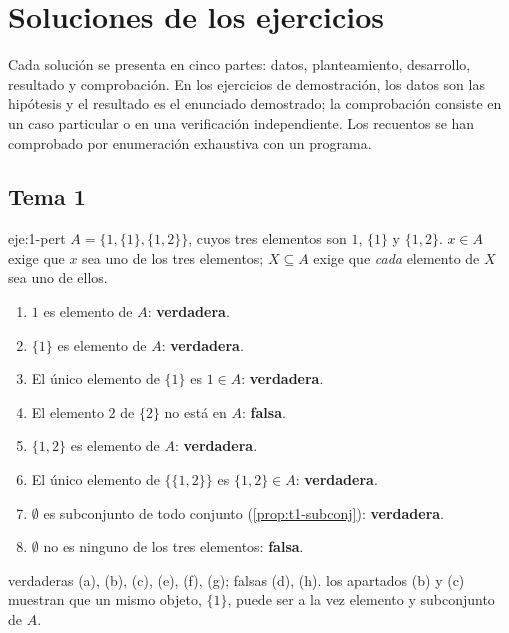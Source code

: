 \chapter{Soluciones de los ejercicios}
\label{ap:soluciones}

Cada solución se presenta en cinco partes: datos, planteamiento, desarrollo, resultado y comprobación. En los ejercicios de demostración, los datos son las hipótesis y el resultado es el enunciado demostrado; la comprobación consiste en un caso particular o en una verificación independiente. Los recuentos se han comprobado por enumeración exhaustiva con un programa.

\section{Tema 1}

\begin{solucion}{eje:1-pert}
\datos $A=\{1,\{1\},\{1,2\}\}$, cuyos tres elementos son $1$, $\{1\}$ y $\{1,2\}$.
\planteamiento $x\in A$ exige que $x$ sea uno de los tres elementos; $X\subseteq A$ exige que \emph{cada} elemento de $X$ sea uno de ellos.
\pasos
\begin{enumerate}[label=(\alph*)]
  \item $1$ es elemento de $A$: \textbf{verdadera}.
  \item $\{1\}$ es elemento de $A$: \textbf{verdadera}.
  \item El único elemento de $\{1\}$ es $1\in A$: \textbf{verdadera}.
  \item El elemento $2$ de $\{2\}$ no está en $A$: \textbf{falsa}.
  \item $\{1,2\}$ es elemento de $A$: \textbf{verdadera}.
  \item El único elemento de $\{\{1,2\}\}$ es $\{1,2\}\in A$: \textbf{verdadera}.
  \item $\emptyset$ es subconjunto de todo conjunto (\cref{prop:t1-subconj}): \textbf{verdadera}.
  \item $\emptyset$ no es ninguno de los tres elementos: \textbf{falsa}.
\end{enumerate}
\resultado verdaderas (a), (b), (c), (e), (f), (g); falsas (d), (h).
\comprobacion los apartados (b) y (c) muestran que un mismo objeto, $\{1\}$, puede ser a la vez elemento y subconjunto de $A$.
\end{solucion}

